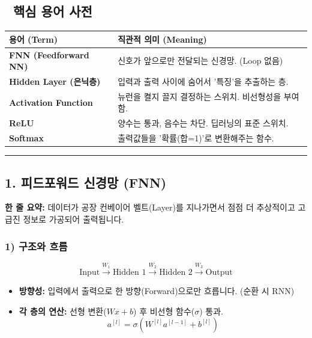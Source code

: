 \documentclass[11pt,a4paper]{book}
\theoremstyle{definition}
\begin{document}
\subsection*{📝 핵심 용어 사전}
\begin{table}[h]
\centering
\begin{tabularx}{\textwidth}{|p{}|X|}
\hline
\textbf{용어 (Term)} & \textbf{직관적 의미 (Meaning)} \\
\hline
\textbf{FNN (Feedforward NN)} & 신호가 앞으로만 전달되는 신경망. (Loop 없음) \\
\hline
\textbf{Hidden Layer (은닉층)} & 입력과 출력 사이에 숨어서 '특징'을 추출하는 층. \\
\hline
\textbf{Activation Function} & 뉴런을 켤지 끌지 결정하는 스위치. 비선형성을 부여함. \\
\hline
\textbf{ReLU} & 양수는 통과, 음수는 차단. 딥러닝의 표준 스위치. \\
\hline
\textbf{Softmax} & 출력값들을 '확률(합=1)'로 변환해주는 함수. \\
\hline
\end{tabularx}
\end{table}

\vspace{0.5cm}\hrule\vspace{0.5cm}

\subsection{1. 피드포워드 신경망 (FNN)}


\begin{conceptbox}[title={개념 1: 정보의 조립 라인}]
\textbf{한 줄 요약:} 데이터가 공장 컨베이어 벨트(Layer)를 지나가면서 점점 더 추상적이고 고급진 정보로 가공되어 출력됩니다.
\end{conceptbox}

\subsubsection*{1) 구조와 흐름}
$$ \text{Input} \xrightarrow{W_1} \text{Hidden 1} \xrightarrow{W_2} \text{Hidden 2} \xrightarrow{W_3} \text{Output} $$
\begin{itemize}
    \item \textbf{방향성:} 입력에서 출력으로 한 방향(Forward)으로만 흐릅니다. (순환 시 RNN)
    \item \textbf{각 층의 연산:} 선형 변환($Wx+b$) 후 비선형 함수($\sigma$) 통과.
    $$ a^{[l]} = \sigma(W^{[l]} a^{[l-1]} + b^{[l]}) $$
\end{itemize}
\end{document}
